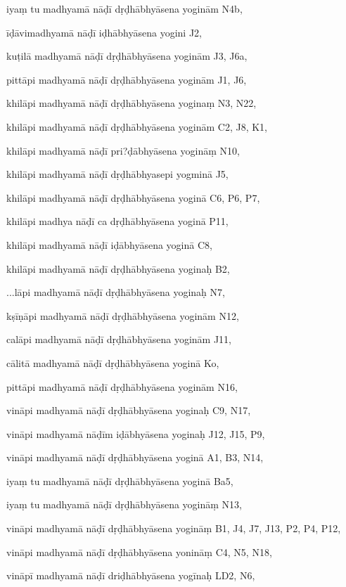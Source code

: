 \begin{marma}[hp03_127]


\item[iyaṃ tu madhyamā nāḍī dṛḍhābhyāsena yoginām] N4b,
\item[īḍāvimadhyamā nāḍī iḍhābhyāsena yogini] J2,
\item[kuṭilā madhyamā nāḍī dṛḍhābhyāsena yoginām] J3, J6a, 
\item[pittāpi madhyamā nāḍī dṛḍhābhyāsena yoginām] J1, J6, 
\item[khilāpi madhyamā nāḍī dṛḍhābhyāsena yoginaṃ] N3, N22, 
\item[khilāpi madhyamā nāḍī dṛḍhābhyāsena yoginām] C2, J8, K1, 
\item[khilāpi madhyamā nāḍī pri?ḍābhyāsena yogināṃ] N10,
\item[khilāpi madhyamā nāḍī dṛḍhābhyasepi yogminā] J5,
\item[khilāpi madhyamā nāḍī dṛḍhābhyāsena yoginā] C6, P6, P7,
\item[khilāpi madhya nāḍī ca dṛḍhābhyāsena yoginā] P11,
\item[khilāpi madhyamā nāḍī iḍābhyāsena yoginā] C8,
\item[khilāpi madhyamā nāḍī dṛḍhābhyāsena yoginaḥ] B2, 
\item[...lāpi madhyamā nāḍī dṛḍhābhyāsena yoginaḥ] N7,
\item[kṣīṇāpi madhyamā nāḍī dṛḍhābhyāsena yoginām] N12,
\item[calāpi madhyamā nāḍī dṛḍhābhyāsena yoginām] J11,
\item[cālitā madhyamā nāḍī dṛḍhābhyāsena yoginā] Ko,
\item[pittāpi madhyamā nāḍī dṛḍhābhyāsena yoginām] N16,
\item[vināpi madhyamā nāḍī dṛḍhābhyāsena yoginaḥ] C9, N17, 
\item[vināpi madhyamā nāḍīm iḍābhyāsena yoginaḥ] J12, J15, P9, 
\item[vināpi madhyamā nāḍī dṛḍhābhyāsena yoginā] A1, B3, N14,
\item[iyaṃ tu madhyamā nāḍī dṛḍhābhyāsena yoginā] Ba5,
\item[iyaṃ tu madhyamā nāḍī dṛḍhābhyāsena yogināṃ] N13, 
\item[vināpi madhyamā nāḍī dṛḍhābhyāsena yogināṃ] B1, J4, J7, J13, P2, P4, P12, 
\item[vināpi madhyamā nāḍī dṛḍhābhyāsena yonināṃ] C4, N5, N18,
\item[vināpī madhyamā nāḍī driḍhābhyāsena yogīnaḥ] LD2, N6, 

\end{marma}
